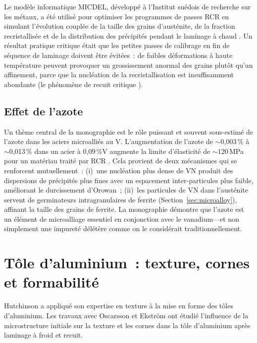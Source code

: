 \documentclass[11pt,a4paper]{article}
\begin{document}
Le mod\`ele informatique MICDEL, d\'evelopp\'e \`a l'Institut su\'edois
de recherche sur les m\'etaux, a \'et\'e utilis\'e pour optimiser les
programmes de passes RCR en simulant l'\'evolution coupl\'ee de la
taille des grains d'aust\'enite, de la fraction recristallis\'ee et de
la distribution des pr\'ecipit\'es pendant le laminage \`a chaud
\cite{Siwecki1992}.  Un r\'esultat pratique critique \'etait que les
petites passes de \og calibrage \fg{} en fin de s\'equence de laminage
doivent \^etre \'evit\'ees~: de faibles d\'eformations \`a haute
temp\'erature peuvent provoquer un grossissement anormal des grains
plut\^ot qu'un affinement, parce que la nucl\'eation de la
recristallisation est insuffisamment abondante (le ph\'enom\`ene de
\og recuit critique \fg{}).

\subsection{Effet de l'azote}

Un th\`eme central de la monographie est le r\^ole puissant et souvent
sous-estim\'e de l'azote dans les aciers microalli\'es au V.
L'augmentation de l'azote de $\sim$0,003\,\% \`a $\sim$0,013\,\% dans
un acier \`a 0,09\,\%V augmente la limite d'\'elasticit\'e de
$\sim$120\,MPa pour un mat\'eriau trait\'e par RCR \cite{Zajac1991}.
Cela provient de deux m\'ecanismes qui se renforcent mutuellement~:
(i)~une nucl\'eation plus dense de VN produit des dispersions de
pr\'ecipit\'es plus fines avec un espacement inter-particules plus
faible, am\'eliorant le durcissement d'Orowan~; (ii)~les particules de
VN dans l'aust\'enite servent de germinateurs intragranulaires de
ferrite (Section~\ref{sec:microalloy}), affinant la taille des grains de
ferrite.  La monographie d\'emontre que l'azote est un \'el\'ement de
microalliage essentiel en conjonction avec le vanadium---et non
simplement une impuret\'e d\'el\'et\`ere comme on le consid\'erait
traditionnellement.

\section{T\^ole d'aluminium~: texture, cornes et formabilit\'e}
\label{sec:aluminium}

Hutchinson a appliqu\'e son expertise en texture \`a la mise en forme des
t\^oles d'aluminium.  Les travaux avec Oscarsson et Ekstr\"om
\cite{Oscarsson1991} ont \'etudi\'e l'influence de la microstructure
initiale sur la texture et les cornes dans la t\^ole d'aluminium apr\`es
laminage \`a froid et recuit.
\end{document}
